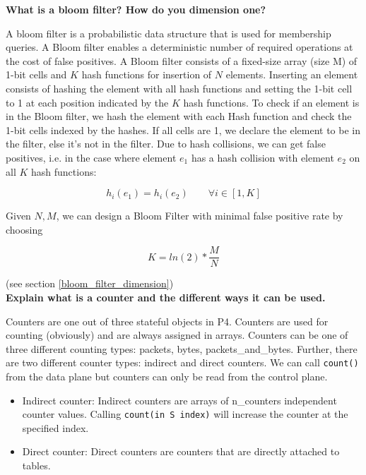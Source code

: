 \documentclass[11pt,oneside,a4paper]{article}
\begin{document}
\noindent \textbf{What is a bloom filter? How do you dimension one?}

A bloom filter is a probabilistic data structure that is used for membership queries. A Bloom filter enables a deterministic number of required operations at the cost of false positives. A Bloom filter consists of a fixed-size array (size M) of 1-bit cells and $K$ hash functions for insertion of $N$ elements. Inserting an element consists of hashing the element with all hash functions and setting the 1-bit cell to 1 at each position indicated by the $K$ hash functions. To check if an element is in the Bloom filter, we hash the element with each Hash function and check the 1-bit cells indexed by the hashes. If all cells are 1, we declare the element to be in the filter, else it's not in the filter. Due to hash collisions, we can get false positives, i.e. in the case where element $e_1$ has a hash collision with element $e_2$ on all $K$ hash functions: 

$$h_i(e_1) = h_i(e_2) \qquad \forall i \in [1,K]$$

\noindent Given $N, M$, we can design a Bloom Filter with minimal false positive rate by choosing 

$$K = ln(2) * \frac{M}{N}$$

\noindent (see section \ref{bloom_filter_dimension})\\

\noindent \textbf{Explain what is a counter and the different ways it can be used.}

Counters are one out of three stateful objects in P4. Counters are used for counting (obviously) and are always assigned in arrays. Counters can be one of three different counting types: packets, bytes, packets\_and\_bytes. Further, there are two different counter types: indirect and direct counters. We can call \texttt{count()} from the data plane but counters can only be read from the control plane.
\vspace{-\topsep}
\begin{itemize}
	\setlength{\itemsep}{0pt}
	\setlength{\parskip}{0pt}
	\item Indirect counter: Indirect counters are arrays of n\_counters independent counter values. Calling \texttt{count(in S index)} will increase the counter at the specified index.
	\item Direct counter: Direct counters are counters that are directly attached to tables.\\
\end{itemize}
\vspace{-\topsep}
\end{document}
